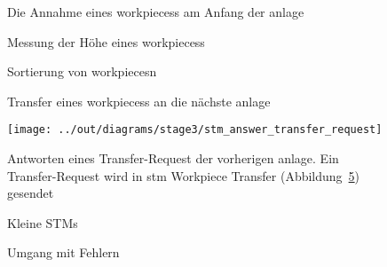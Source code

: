 \begin{figure}
    \caption{Die Annahme eines \glspl{workpiece}s am Anfang der \gls{anlage}}
    \label{fig:stm_recieve_workpiece}
\end{figure}

\begin{figure}
    \caption{Messung der Höhe eines \glspl{workpiece}s}
    \label{fig:stm_hoehe_messen}
\end{figure}

\begin{figure}
    \caption{Sortierung von \glspl{workpiece}n}
    \label{fig:stm_sort_workpiece}
\end{figure}

\begin{figure}
    \caption{Transfer eines \glspl{workpiece}s an die nächste \gls{anlage}}
    \label{fig:stm_workpiece_transfer}
\end{figure}

\begin{figure}
    \centering
    \texttt{[image: ../out/diagrams/stage3/stm\_answer\_transfer\_request]}
    \caption{Antworten eines Transfer-Request der vorherigen \gls{anlage}.
    Ein Transfer-Request wird in stm Workpiece Transfer (Abbildung~\ref{fig:stm_workpiece_transfer_request}) gesendet}
    \label{fig:stm_workpiece_transfer_request}
\end{figure}

\begin{figure}
    \caption{Kleine STMs}
    \label{fig:stm_small_stms}
\end{figure}

\begin{figure}
    \caption{Umgang mit Fehlern}
    \label{fig:stm_error_listener}
\end{figure}




